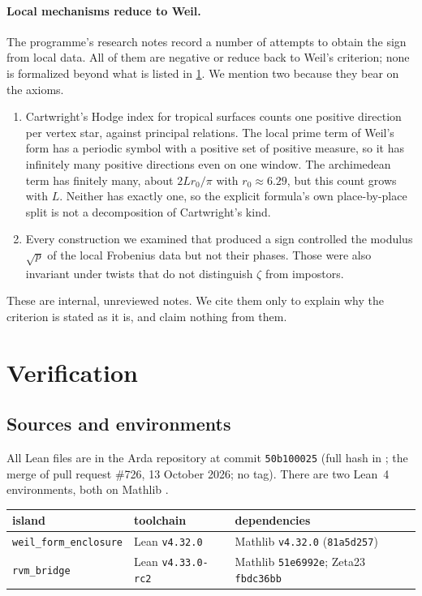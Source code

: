 \documentclass[11pt]{article}
\theoremstyle{definition}
\newcommand{\lean}[1]{\texttt{#1}}
\begin{document}
\paragraph{Local mechanisms reduce to Weil.} The programme's research notes \cite{Arda} record a number of attempts to obtain the sign from local data. All of them are negative or reduce back to Weil's criterion; none is formalized beyond what is listed in \cref{sec:verification}. We mention two because they bear on the axioms.
\begin{enumerate}[leftmargin=*]
\item Cartwright's Hodge index for tropical surfaces \cite{Cartwright} counts one positive direction per vertex star, against principal relations. The local prime term of Weil's form has a periodic symbol with a positive set of positive measure, so it has infinitely many positive directions even on one window. The archimedean term has finitely many, about $2Lr_0/\pi$ with $r_0 \approx 6.29$, but this count grows with $L$. Neither has exactly one, so the explicit formula's own place-by-place split is not a decomposition of Cartwright's kind.
\item Every construction we examined that produced a sign controlled the modulus $\sqrt p$ of the local Frobenius data but not their phases. Those were also invariant under twists that do not distinguish $\zeta$ from impostors.
\end{enumerate}
These are internal, unreviewed notes. We cite them only to explain why the criterion is stated as it is, and claim nothing from them.

\section{Verification}\label{sec:verification}

\subsection{Sources and environments}

All Lean files are in the Arda repository \cite{Arda} at commit \lean{50b100025} (full hash in \cite{Arda}; the merge of pull request \#726, 13 October 2026; no tag). There are two Lean~4 \cite{Lean} environments, both on Mathlib \cite{Mathlib}.

\begin{center}\small
\begin{tabular}{@{}lll@{}}
\toprule
island & toolchain & dependencies \\
\midrule
\lean{weil\_form\_enclosure} & Lean \lean{v4.32.0} & Mathlib \lean{v4.32.0} (\lean{81a5d257}) \\
\lean{rvm\_bridge} & Lean \lean{v4.33.0-rc2} & Mathlib \lean{51e6992e}; Zeta23 \lean{fbdc36bb} \\
\bottomrule
\end{tabular}
\end{center}
\end{document}
